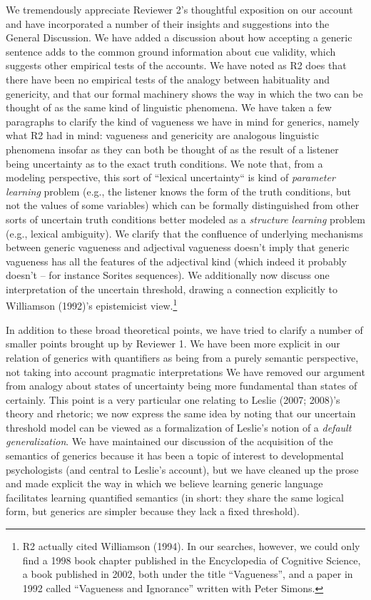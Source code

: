 \documentclass[11pt,letterpaper]{letter} %
\begin{document}
\begin{letter}
We tremendously appreciate Reviewer 2's thoughtful exposition on our account and have incorporated a number of their insights and suggestions into the General Discussion.
We have added a discussion about how accepting a generic sentence adds to the common ground information about cue validity, which suggests other empirical tests of the accounts.
We have noted as R2 does that there have been no empirical tests of the analogy between habituality and genericity, and that our formal machinery shows the way in which the two can be thought of as the same kind of linguistic phenomena.
We have taken a few paragraphs to clarify the kind of vagueness we have in mind for generics, namely what R2 had in mind: vagueness and genericity are analogous linguistic phenomena insofar as they can both be thought of as the result of a listener being uncertainty as to the exact truth conditions. 
We note that, from a modeling perspective, this sort of ``lexical uncertainty`` is kind of \emph{parameter learning} problem (e.g., the listener knows the form of the truth conditions, but not the values of some variables) which can be formally distinguished from other sorts of uncertain truth conditions better modeled as a \emph{structure learning} problem (e.g., lexical ambiguity). 
We clarify that the confluence of underlying mechanisms between generic vagueness and adjectival vagueness doesn't imply that generic vagueness has all the features of the adjectival kind (which indeed it probably doesn't -- for instance Sorites sequences).
We additionally now discuss one interpretation of the uncertain threshold, drawing a connection explicitly to Williamson (1992)'s epistemicist view.\footnote{
	R2 actually cited Williamson (1994). In our searches, however, we could only find a 1998 book chapter published in the Encyclopedia of Cognitive Science, a book published in 2002, both under the title ``Vagueness'', and a paper in 1992 called ``Vagueness and Ignorance'' written with Peter Simons. 
}

In addition to these broad theoretical points, we have tried to clarify a number of smaller points brought up by Reviewer 1.
We have been more explicit in our relation of generics with quantifiers as being from a purely semantic perspective, not taking into account pragmatic interpretations
We have removed our argument from analogy about states of uncertainty being more fundamental than states of certainly.
This point is a very particular one relating to Leslie (2007; 2008)'s theory and rhetoric; we now express the same idea by noting that our uncertain threshold model can be viewed as a formalization of Leslie's notion of a \emph{default generalization}. 
We have maintained our discussion of the acquisition of the semantics of generics because it has been a topic of interest to developmental psychologists (and central to Leslie's account), but we have cleaned up the prose and made explicit the way in which we believe learning generic language facilitates learning quantified semantics (in short: they share the same logical form, but generics are simpler because they lack a fixed threshold).


\end{letter}
\end{document}
